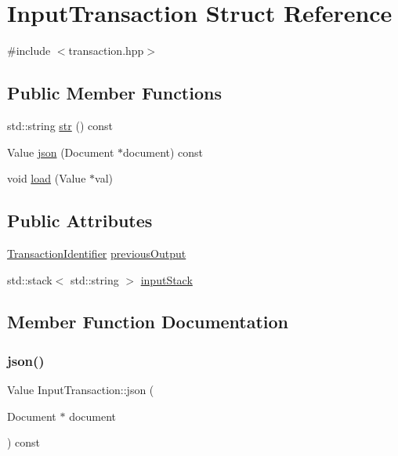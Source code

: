 \hypertarget{structInputTransaction}{}\section{Input\+Transaction Struct Reference}
\label{structInputTransaction}


{\ttfamily \#include $<$transaction.\+hpp$>$}

\subsection*{Public Member Functions}
\begin{DoxyCompactItemize}
\item 
std\+::string \mbox{\hyperlink{structInputTransaction_ac544bf7bb6c65ceafe3aaa76ce04783a}{str}} () const
\item 
Value \mbox{\hyperlink{structInputTransaction_a48914f7da4bbaae7196eda78cfb359d3}{json}} (Document $\ast$document) const
\item 
void \mbox{\hyperlink{structInputTransaction_a3ce95ac10008ae44a701100579cb4ae4}{load}} (Value $\ast$val)
\end{DoxyCompactItemize}
\subsection*{Public Attributes}
\begin{DoxyCompactItemize}
\item 
\mbox{\hyperlink{structTransactionIdentifier}{Transaction\+Identifier}} \mbox{\hyperlink{structInputTransaction_aef6b521b9cfe79765920ffde4436e214}{previous\+Output}}
\item 
std\+::stack$<$ std\+::string $>$ \mbox{\hyperlink{structInputTransaction_aa5a4cc7735e13f63091dc5db7752c51f}{input\+Stack}}
\end{DoxyCompactItemize}


\subsection{Member Function Documentation}
\mbox{\label{structInputTransaction_a48914f7da4bbaae7196eda78cfb359d3}} 
\subsubsection{\texorpdfstring{json()}{json()}}
{\footnotesize\ttfamily Value Input\+Transaction\+::json (\begin{DoxyParamCaption}\item[{Document $\ast$}]{document }\end{DoxyParamCaption}) const}

